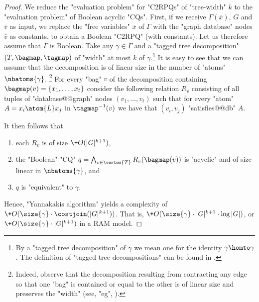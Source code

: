 \begin{proof}
    We reduce the "evaluation problem" for "C2RPQs" of "tree-width" $k$ to the "evaluation problem" of Boolean acyclic "CQs". First, if we receive $\Gamma (\bar x)$, $G$ and $\bar v$ as input, we replace the "free variables" $\bar x$ of $\Gamma$ with the "graph database" nodes $\bar v$ as constants, to obtain a Boolean "C2RPQ" (with constants). Let us therefore assume that $\Gamma$ is Boolean.
	Take any $\gamma \in \Gamma$ and a "tagged tree decomposition" $(T, \bagmap, \tagmap)$ of "width" at most $k$ of $\gamma$.\footnote{By a "tagged tree decomposition" of $\gamma$ we mean one for the identity $\gamma \homto \gamma$. The definition of "tagged tree decompositions" can be found in .}
	It is easy to see that we can assume that the decomposition is of linear size in the number of "atoms" $\nbatoms{\gamma}$.%
	\footnote{
		Indeed, observe that the decomposition resulting from contracting any edge so that one "bag" is contained or equal to the other is of linear size and preserves the "width" (see, "eg", \cite{GottlobLeoneScarcelloHypertreeDecompositions}).
	}
	 For every "bag" $v$ of the decomposition containing $\bagmap(v)=\set{x_1, \dotsc, x_t}$ consider the following relation $R_v$ consisting of all tuples of "database@@graph" nodes $(v_1, \dotsc, v_t)$ such that for every "atom" $A=x_i \atom{L} x_j$ in $\tagmap^{-1}(v)$ we have that $(v_i, v_j)$ "satisfies@@db" $A$.


    It then follows that 
    \begin{enumerate}
        \item  each $R_v$ is of size $\+O(|G|^{k+1})$, 
        \item the "Boolean" "CQ" $q = \bigwedge_{v \in \vertex{T}} R_v(\bagmap(v))$ is "acyclic" and of size linear in $\nbatoms{\gamma}$, and 
        \item $q$ is "equivalent" to $\gamma$.
    \end{enumerate}
    Hence, "Yannakakis algorithm" yields a complexity of $\+O(\size{\gamma} \cdot \costjoin(|G|^{k+1}))$. That is, $\+O(\size{\gamma} \cdot |G|^{k+1} \cdot \log{|G|})$, or $\+O(\size{\gamma} \cdot |G|^{k+1})$ in a RAM model.


\end{proof}
